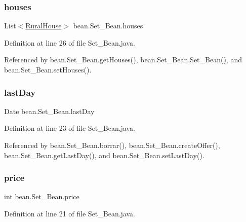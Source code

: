 \subsubsection{\texorpdfstring{houses}{houses}}
{\footnotesize\ttfamily List$<$\mbox{\hyperlink{classdomain_1_1RuralHouse}{Rural\+House}}$>$ bean.\+Set\+\_\+\+Bean.\+houses\hspace{0.3cm}{\ttfamily [private]}}



Definition at line 26 of file Set\+\_\+\+Bean.\+java.



Referenced by bean.\+Set\+\_\+\+Bean.\+get\+Houses(), bean.\+Set\+\_\+\+Bean.\+Set\+\_\+\+Bean(), and bean.\+Set\+\_\+\+Bean.\+set\+Houses().

\mbox{\label{classbean_1_1Set__Bean_ab7eaecf178a4ca10c791779a0bf72954}} 
\subsubsection{\texorpdfstring{lastDay}{lastDay}}
{\footnotesize\ttfamily Date bean.\+Set\+\_\+\+Bean.\+last\+Day\hspace{0.3cm}{\ttfamily [private]}}



Definition at line 23 of file Set\+\_\+\+Bean.\+java.



Referenced by bean.\+Set\+\_\+\+Bean.\+borrar(), bean.\+Set\+\_\+\+Bean.\+create\+Offer(), bean.\+Set\+\_\+\+Bean.\+get\+Last\+Day(), and bean.\+Set\+\_\+\+Bean.\+set\+Last\+Day().

\mbox{\label{classbean_1_1Set__Bean_a667afccf27f2b9861fecfb2f23bf9041}} 
\subsubsection{\texorpdfstring{price}{price}}
{\footnotesize\ttfamily int bean.\+Set\+\_\+\+Bean.\+price\hspace{0.3cm}{\ttfamily [private]}}



Definition at line 21 of file Set\+\_\+\+Bean.\+java.



